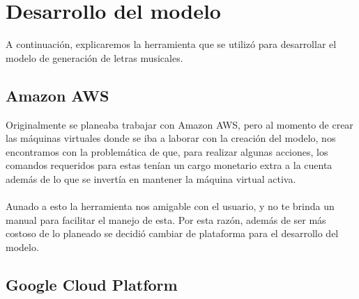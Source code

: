 \documentclass[12pt, a4paper, titlepage]{report}
\begin{document}
\section{Desarrollo del modelo}

A continuación, explicaremos la herramienta que se utilizó para desarrollar el modelo de generación de letras musicales.

\subsection{Amazon AWS}


Originalmente se planeaba trabajar con Amazon AWS, pero al momento de crear las máquinas virtuales donde se iba a laborar con la creación del modelo, nos encontramos con la problemática de que, para realizar algunas acciones, los comandos requeridos para estas tenían un cargo monetario extra a la cuenta además de lo que se invertía en mantener la máquina virtual activa.\\\\
Aunado a esto la herramienta nos amigable con el usuario, y no te brinda un manual para facilitar el manejo de esta. Por esta razón, además de ser más costoso de lo planeado se decidió cambiar de plataforma para el desarrollo del modelo.

\subsection{Google Cloud Platform}
\end{document}
